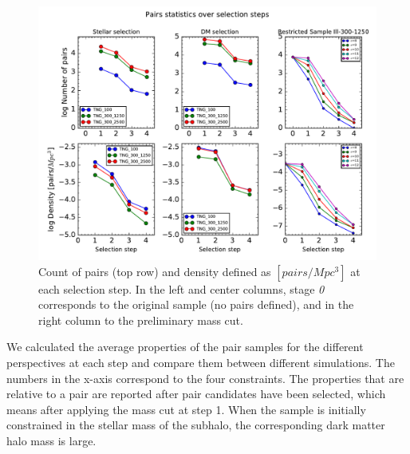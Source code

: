 \documentclass[fleqn,usenatbib]{mnras}
\begin{document}
\begin{figure}
\centering
\includegraphics[scale=0.43]{NumberPairs.pdf}
\caption{\label{fig:pairs} Count of pairs (top row) and density defined as $[pairs/Mpc^3]$ at each selection step. In the left and center columns, stage \textit{0} corresponds to the original sample (no pairs defined), and in the right column to the preliminary mass cut.}
\end{figure}
 
 
We calculated the average properties of the pair samples for the different perspectives at each step and compare them between different simulations. The numbers in the x-axis correspond to the four constraints. The properties that are relative to a pair are reported after pair candidates have been selected, which means after applying the mass cut at step 1. 
When the sample is initially constrained in the stellar mass of the subhalo, the corresponding dark matter halo mass is large. 
 
\end{document}
